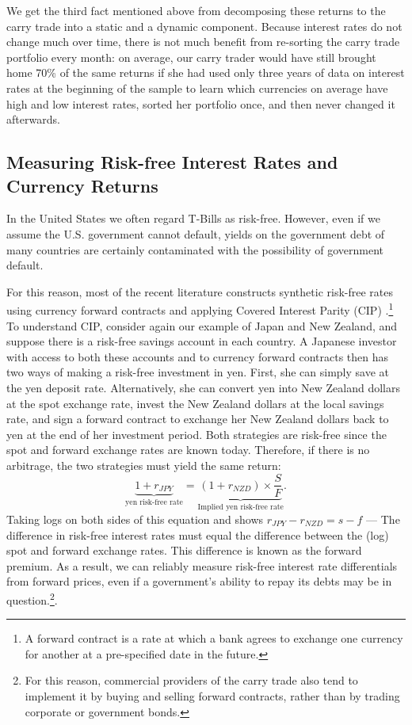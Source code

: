 \documentclass{ar-1col}
\begin{document}
We get the third fact mentioned above from decomposing these returns to the carry trade into a static and a dynamic component. Because interest rates do not change much over time, there is not much benefit from re-sorting the carry trade portfolio every month: on average, our carry trader would have still brought home 70\% of the same returns if she had used only three years of data on interest rates at the beginning of the sample to learn which currencies on average have high and low interest rates, sorted her portfolio once, and then never changed it afterwards.

\begin{textbox}[]\section{Measuring Risk-free Interest Rates and Currency Returns}
    In the United States we often regard T-Bills as risk-free. However, even if we assume the U.S. government cannot default, yields on the government debt of many countries are certainly contaminated with the possibility of government default.

    For this reason, most of the recent literature constructs synthetic risk-free rates using currency forward contracts and applying Covered Interest Parity (CIP) \citep{LustigRoussanovVerdelhan2011, DuSchreger2016}.\footnote{A forward contract is a rate at which a bank agrees to exchange one currency for another at a pre-specified date in the future.} To understand CIP, consider again our example of Japan and New Zealand, and suppose there is a risk-free savings account in each country. A Japanese investor with access to both these accounts and to currency forward contracts then has two ways of making a risk-free investment in yen. First, she can simply save at the yen deposit rate. Alternatively, she can convert yen into New Zealand dollars at the spot exchange rate, invest the New Zealand dollars at the local savings rate, and sign a forward contract to exchange her New Zealand dollars back to yen at the end of her investment period. Both strategies are risk-free since the spot and forward exchange rates are known today. Therefore, if there is no arbitrage, the two strategies must yield the same return:
    \begin{equation}
    \underbrace{1 + r_{JPY}}_{\text{yen risk-free rate}}
    = \underbrace{
        (1 + r_{NZD}) \times \frac{S}{F}
    }_{\text{Implied yen risk-free rate}}.
    \end{equation}
    Taking logs on both sides of this equation and shows $r_{JPY}-r_{NZD} = s - f$ --- The difference in risk-free interest rates must equal the difference between the (log) spot and forward exchange rates. This difference is known as the forward premium. As a result, we can reliably measure risk-free interest rate differentials from forward prices, even if a government's ability to repay its debts may be in question.\footnote{For this reason, commercial providers of the carry trade also tend to implement it by buying and selling forward contracts, rather than by trading corporate or government bonds.}.
\end{textbox}
\end{document}
